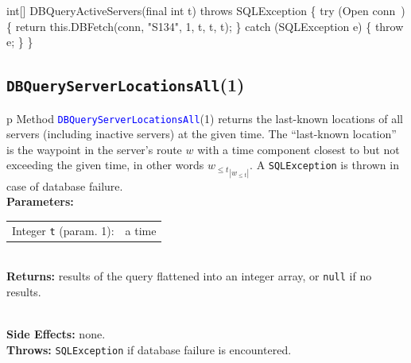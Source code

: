 int[] DBQueryActiveServers(final int t) throws SQLException \{
  try (\LA{}Open \code{}conn\edoc{}~{\nwtagstyle{}}\RA{}) \{
    return this.DBFetch(conn, "S134", 1, t, t, t);
  \} catch (SQLException e) \{
    throw e;
  \}
\}
\eatline
{}\nwendcode{}\nwdocspar
\subsection{\texttt{DBQueryServerLocationsAll}(1)}
\begin{tabular}{p{\textwidth}}
\toprule
{}
Method \textcolor{blue}{{\tt{}\protect{}DBQueryServerLocationsAll}}(1) returns the
last-known locations of all servers (including inactive servers) at the given
time. The ``last-known location'' is the waypoint in the server's route $w$
with a time component closest to but not exceeding the given time, in other
words ${w_{\leq t}}_{|w_{\leq t}|}$.
A {\tt{}SQLException} is thrown in case of database failure.\\
\midrule
\textbf{Parameters:} \\
\begin{tabular}{lp{116mm}}
Integer {\tt{}t} (param. 1):&a time
\end{tabular}\\
\textbf{Returns:} results of the query flattened into an integer array, or
{\tt{}null} if no results.

\\
\textbf{Side Effects:} none.\\
\textbf{Throws:} {\tt{}SQLException} if database failure is encountered.\\
\bottomrule
\end{tabular}

